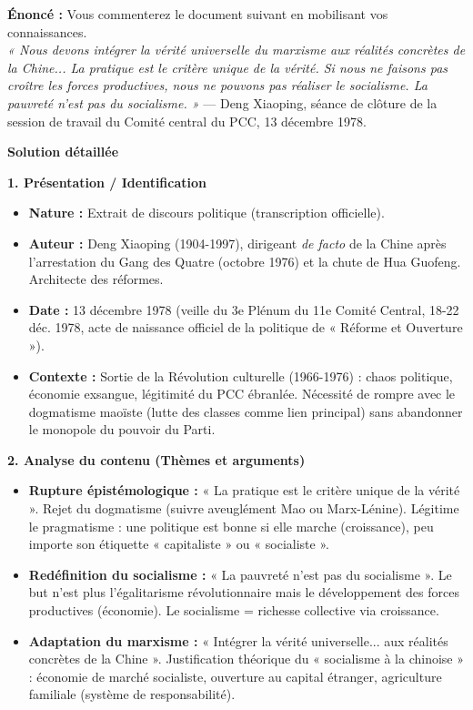 \documentclass[11pt]{article}
\newcommand{\cle}[1]{{\popxbold\color{popdark}#1}}
\begin{document}
\begin{exoresolu}
\textbf{Énoncé :} Vous commenterez le document suivant en mobilisant vos connaissances.\\
\textit{« Nous devons intégrer la vérité universelle du marxisme aux réalités concrètes de la Chine... La pratique est le critère unique de la vérité. Si nous ne faisons pas croître les forces productives, nous ne pouvons pas réaliser le socialisme. La pauvreté n'est pas du socialisme. »} — Deng Xiaoping, séance de clôture de la session de travail du Comité central du PCC, 13 décembre 1978.

\tcblower
\textbf{Solution détaillée}

\textbf{1. Présentation / Identification}
\begin{itemize}
    \item \textbf{Nature :} Extrait de discours politique (transcription officielle).
    \item \textbf{Auteur :} \cle{Deng Xiaoping} (1904-1997), dirigeant \emph{de facto} de la Chine après l'arrestation du Gang des Quatre (octobre 1976) et la chute de Hua Guofeng. Architecte des réformes.
    \item \textbf{Date :} 13 décembre 1978 (veille du \cle{3e Plénum du 11e Comité Central}, 18-22 déc. 1978, acte de naissance officiel de la politique de « Réforme et Ouverture »).
    \item \textbf{Contexte :} Sortie de la \cle{Révolution culturelle} (1966-1976) : chaos politique, économie exsangue, légitimité du PCC ébranlée. Nécessité de rompre avec le dogmatisme maoïste (lutte des classes comme lien principal) sans abandonner le monopole du pouvoir du Parti.
\end{itemize}

\textbf{2. Analyse du contenu (Thèmes et arguments)}
\begin{itemize}
    \item \textbf{Rupture épistémologique :} « La pratique est le critère unique de la vérité ». Rejet du dogmatisme (suivre aveuglément Mao ou Marx-Lénine). Légitime le pragmatisme : une politique est bonne si elle marche (croissance), peu importe son étiquette « capitaliste » ou « socialiste ».
    \item \textbf{Redéfinition du socialisme :} « La pauvreté n'est pas du socialisme ». Le but n'est plus l'égalitarisme révolutionnaire mais le développement des \cle{forces productives} (économie). Le socialisme = richesse collective via croissance.
    \item \textbf{Adaptation du marxisme :} « Intégrer la vérité universelle... aux réalités concrètes de la Chine ». Justification théorique du « socialisme à la chinoise » : économie de marché socialiste, ouverture au capital étranger, agriculture familiale (système de responsabilité).
\end{itemize}


\end{exoresolu}
\end{document}
